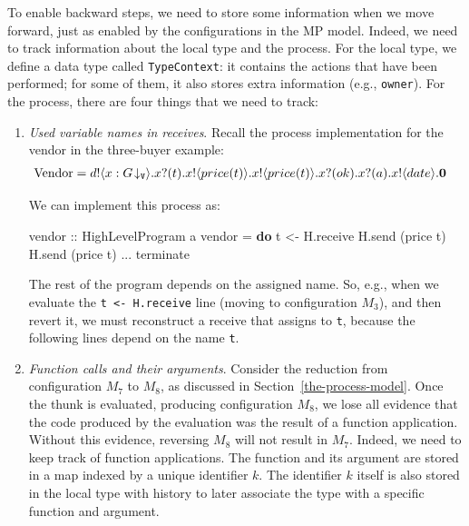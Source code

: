 \documentclass[runningheads,plain]{llncs}
\newenvironment{Shaded}{}{}
\newcommand{\KeywordTok}[1]{\textcolor[rgb]{0.00,0.44,0.13}{\textbf{#1}}}
\newcommand{\DataTypeTok}[1]{\textcolor[rgb]{0.56,0.13,0.00}{#1}}
\newcommand{\OtherTok}[1]{\textcolor[rgb]{0.00,0.44,0.13}{#1}}
\newcommand{\FunctionTok}[1]{\textcolor[rgb]{0.02,0.16,0.49}{#1}}
\newcommand{\NormalTok}[1]{#1}
\begin{document}
To enable backward steps, we need to store some information when we move forward, just as enabled by the configurations in the MP model.
Indeed, we need to track information about the local type and the process.
For the local type, we define a data type called \texttt{TypeContext}: it
contains the actions that have been performed; for some of them, it also
stores extra information (e.g., \texttt{owner}).
For the process, there are four things that we need to track:

\begin{enumerate}[1.]
\def\labelenumi{\arabic{enumi}.}
\item \emph{Used variable names in receives}.
    Recall the process implementation for  the vendor in the three-buyer example:
  \begin{align*}
  \text{Vendor} & =  d ! \langle x:G\!\downarrow_{\mathtt{V}} \rangle .x ? (t) .x ! \langle price(t) \rangle .x ! \langle price(t) \rangle . x ? (ok) .x ? (a) . x ! \langle date \rangle .\mathbf{0}
  \end{align*}

We can implement this process as:
\begin{Shaded}
\begin{Highlighting}[]
\OtherTok{vendor ::} \DataTypeTok{HighLevelProgram}\NormalTok{ a}
\NormalTok{vendor }\FunctionTok{=} \KeywordTok{do} 
\NormalTok{    t }\OtherTok{<-}\NormalTok{ H.receive }
\NormalTok{    H.send (price t) }
\NormalTok{    H.send (price t) }
    \FunctionTok{...}
\NormalTok{    terminate}
\end{Highlighting}
\end{Shaded}
  The rest of the program depends on the assigned name. So, e.g.,
  when we evaluate the \texttt{t\ \textless{}-\ H.receive} line
  (moving to configuration \(M_3\)), and then revert it, we must
  reconstruct a receive that assigns to \texttt{t}, because the
  following lines depend on the name \texttt{t}. \\

\item \emph{Function calls and their arguments}.
      Consider the reduction from configuration $M_7$ to $M_8$, as discussed in Section~\ref{the-process-model}. Once the thunk
  is evaluated, producing configuration \(M_8\), we lose all evidence that the
  code produced by the evaluation  was the result of a function
  application. 
  Without this evidence, reversing $M_8$ will
  not result in $M_7$. Indeed, we need to keep track of function
  applications. The function and its argument are stored in a map
  indexed by a unique identifier $k$. The identifier $k$ itself is also
  stored in the local type with history to later associate the type with
  a specific function and argument.


\end{enumerate}
\end{document}

